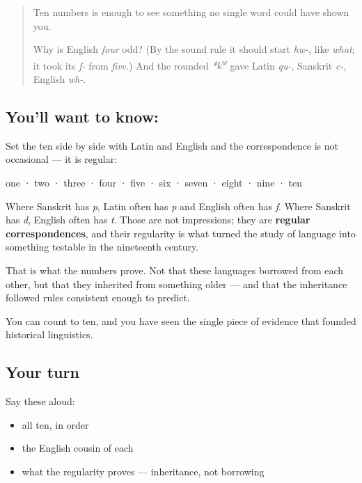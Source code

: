 \begin{quote}
Ten numbers is enough to see something no single word could have shown you.

Why is English \emph{four} odd? (By the sound rule it should start \emph{hw-}, like \emph{what}; it took its \emph{f-} from \emph{five}.) And the rounded \emph{*k\textsuperscript{w}} gave Latin \emph{qu-}, Sanskrit \emph{c-}, English \emph{wh-}.
\end{quote}

\subsection*{You'll want to know: }
Set the ten side by side with Latin and English and the correspondence is not occasional — it is regular:

 one ·  two ·  three ·  four ·  five ·  six ·  seven ·  eight ·  nine ·  ten

Where Sanskrit has \emph{p}, Latin often has \emph{p} and English often has \emph{f}. Where Sanskrit has \emph{d}, English often has \emph{t}. Those are not impressions; they are \textbf{regular correspondences}, and their regularity is what turned the study of language into something testable in the nineteenth century.

That is what the numbers prove. Not that these languages borrowed from each other, but that they inherited from something older — and that the inheritance followed rules consistent enough to predict.

\begin{grammarlens}[title={What you've built}]
You can count to ten, and you have seen the single piece of evidence that founded historical linguistics.
\end{grammarlens}

\subsection*{Your turn}
Say these aloud:

\begin{itemize}
\raggedright
  \item all ten, in order
  \item the English cousin of each
  \item what the regularity proves — inheritance, not borrowing
\end{itemize}


